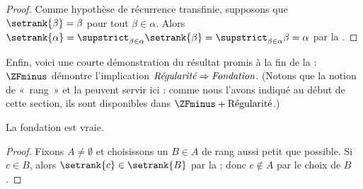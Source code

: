 \documentclass[../../../include/open-logic-section]{subfiles}
\begin{document}
\begin{proof}
Comme hypothèse de récurrence transfinie, supposons que
$\setrank{\beta} = \beta$ pour tout $\beta \in \alpha$. Alors
$\setrank{\alpha} = \supstrict_{\beta \in \alpha}\setrank{\beta}
= \supstrict_{\beta \in \alpha}\beta = \alpha$ par la
.
%
\end{proof}

Enfin, voici une courte démonstration du résultat promis à la fin de la
 : $\ZFminus$ démontre l'implication
$\emph{Régularité} \Rightarrow \emph{Fondation}$. (Notons que la
notion de «~rang~» et la  peuvent servir ici :
comme nous l'avons indiqué au début de cette section, ils sont
disponibles dans $\ZFminus + \text{Régularité}$.)

\begin{prop}
La fondation est vraie.
\end{prop}

\begin{proof}
Fixons $A \neq \emptyset$ et choisissons un
$B \in A$ de rang aussi petit que possible. Si $c \in B$, alors
$\setrank{c} \in \setrank{B}$ par la  ; donc
$c \notin A$ par le choix de $B$.
\end{proof}
\end{document}

